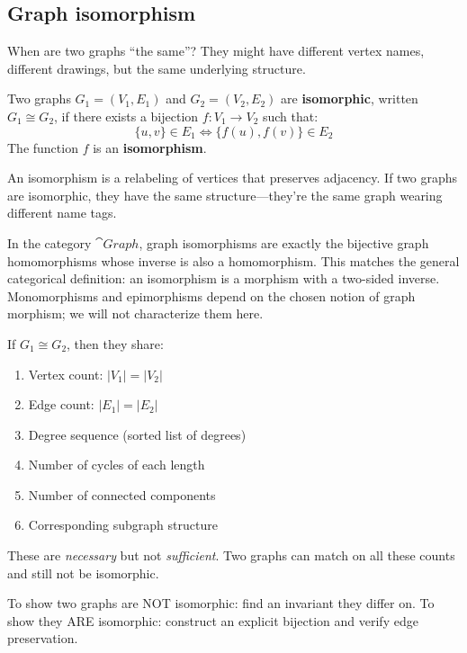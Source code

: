 \subsection*{Graph isomorphism}

When are two graphs ``the same''? They might have different vertex names, different drawings, but the same underlying structure.

\begin{definition}
Two graphs $G_1 = (V_1, E_1)$ and $G_2 = (V_2, E_2)$ are \textbf{isomorphic}, written $G_1 \cong G_2$, if there exists a bijection $f: V_1 \to V_2$ such that:
\[
\{u, v\} \in E_1 \iff \{f(u), f(v)\} \in E_2
\]
The function $f$ is an \textbf{isomorphism}.
\end{definition}

An isomorphism is a relabeling of vertices that preserves adjacency. If two graphs are isomorphic, they have the same structure---they're the same graph wearing different name tags.

\begin{keyresult}
In the category $\cat{Graph}$, graph isomorphisms are exactly the bijective graph homomorphisms whose inverse is also a homomorphism. This matches the general categorical definition: an isomorphism is a morphism with a two-sided inverse.
Monomorphisms and epimorphisms depend on the chosen notion of graph morphism; we will not characterize them here.
\end{keyresult}

\begin{theorem}
If $G_1 \cong G_2$, then they share:
\begin{enumerate}
  \item Vertex count: $|V_1| = |V_2|$
  \item Edge count: $|E_1| = |E_2|$
  \item Degree sequence (sorted list of degrees)
  \item Number of cycles of each length
  \item Number of connected components
  \item Corresponding subgraph structure
\end{enumerate}
These are \emph{necessary} but not \emph{sufficient}. Two graphs can match on all these counts and still not be isomorphic.
\end{theorem}

\begin{strategy}
To show two graphs are NOT isomorphic: find an invariant they differ on.
To show they ARE isomorphic: construct an explicit bijection and verify edge preservation.
\end{strategy}

